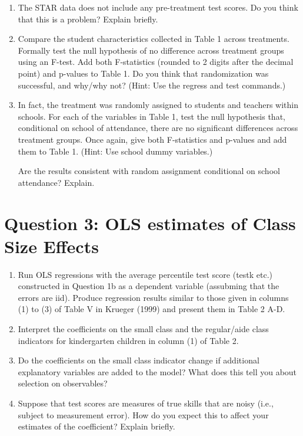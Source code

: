 \documentclass{article}
\begin{document}
\begin{enumerate}[label=\alph*]

\item  The STAR data does not include any pre-treatment test scores. Do you think that this is a problem? Explain briefly.

\item  Compare the student characteristics collected in Table 1 across treatments. Formally test the null hypothesis of no difference across treatment groups using an F-test. Add both F-statistics (rounded to 2 digits after the decimal point) and p-values to Table 1. Do you think that randomization was successful, and why/why not? (Hint: Use the regress and test commands.)

\item  In fact, the treatment was randomly assigned to students and teachers within schools. For each of the variables in Table 1, test the null hypothesis that, conditional on school of attendance, there are no significant differences across treatment groups. Once again, give both F-statistics and p-values and add them to Table 1. (Hint: Use school dummy variables.) 

Are the results consistent with random assignment conditional on school attendance? Explain.

\end{enumerate}


\section{Question 3:  OLS estimates of Class Size Effects}

\begin{enumerate}[label=\alph*]

\item Run OLS regressions with the average percentile test score (testk etc.) constructed in Question 1b as a dependent variable (assubming that the errors are iid). Produce regression results similar to those given in columns (1) to (3) of Table V in Krueger (1999) and present them in Table 2 A-D.

\item  Interpret the coefficients on the small class and the regular/aide class indicators for kindergarten children in column (1) of Table 2.

\item  Do the coefficients on the small class indicator change if additional explanatory variables are added to the model? What does this tell you about selection on observables?

\item  Suppose that test scores are measures of true skills that are noisy (i.e., subject to measurement error). How do you expect this to affect your estimates of the coefficient? Explain briefly.

\end{enumerate}
\end{document}
